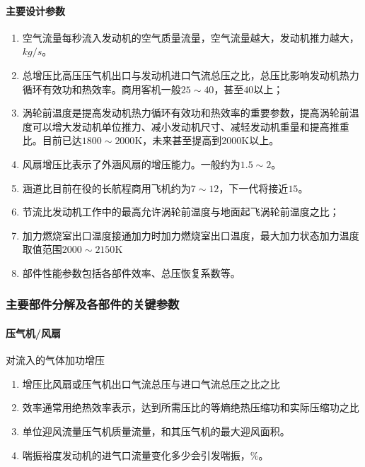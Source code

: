 \documentclass[12pt,a4paper]{report}
\begin{document}
\paragraph{主要设计参数}
\begin{enumerate}
\item 空气流量\textemdash 每秒流入发动机的空气质量流量，空气流量越大，发动机推力越大，$kg/s$。
\item 总增压比\textemdash 高压压气机出口与发动机进口气流总压之比，总压比影响发动机热力循环有效功和热效率。商用客机一般$25\sim 40$，甚至$40$以上；
\item 涡轮前温度\textemdash 是提高发动机热力循环有效功和热效率的重要参数，提高涡轮前温度可以增大发动机单位推力、减小发动机尺寸、减轻发动机重量和提高推重比。目前已达$1800\sim 2000$K，未来甚至提高到$2000$K以上。
\item 风扇增压比\textemdash 表示了外涵风扇的增压能力。一般约为$1.5\sim 2$。
\item 涵道比\textemdash 目前在役的长航程商用飞机约为$7\sim 12$，下一代将接近$15$。
\item 节流比\textemdash 发动机工作中的最高允许涡轮前温度与地面起飞涡轮前温度之比；
\item 加力燃烧室出口温度\textemdash 接通加力时加力燃烧室出口温度，最大加力状态加力温度取值范围$2000\sim 2150$K
\item 部件性能参数\textemdash 包括各部件效率、总压恢复系数等。
\end{enumerate}

\subsubsection{主要部件分解及各部件的关键参数}

\paragraph{压气机/风扇} 对流入的气体加功增压

\begin{enumerate}
\item 增压比\textemdash 风扇或压气机出口气流总压与进口气流总压之比之比
\item 效率\textemdash 通常用绝热效率表示，达到所需压比的等熵绝热压缩功和实际压缩功之比
\item 单位迎风流量\textemdash 压气机质量流量，和其压气机的最大迎风面积。
\item 喘振裕度\textemdash 发动机的进气口流量变化多少会引发喘振，$\%$。 
\end{enumerate}
\end{document}
